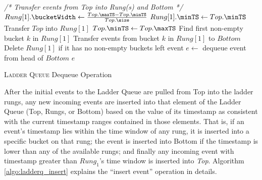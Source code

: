 \documentclass[11pt]{book}
\begin{document}
\begin{algorithm}
\DontPrintSemicolon
{}

    \;
    \;
    \textit{/* Transfer events from Top into Rung(s) and Bottom */}\;
    \;
    $Rung[1].\bucketWidth \gets \frac{Top.\maxTS - Top.\minTS}{Top.\size}$\;
    \;
    $Rung[1].\minTS \gets Top.\minTS$\;
    Transfer $Top$ into $Rung[1]$\;
    $Top.\minTS \gets Top.\maxTS$\;
    Find first non-empty bucket $k$ in $Rung[1]$\;
    Transfer events from bucket $k$ in $Rung[1]$ to $Bottom$\;
    Delete $Rung[1]$ if it has no non-empty buckets left\;
    \;
    event $e \gets$ dequeue event from head of $Bottom$\;
    \Return $e$\;
    \;
\caption{\textsc{Ladder Queue} Dequeue Operation}\label{algo:ladderq_dequeue}
\end{algorithm}

After the initial events to the Ladder Queue are pulled from Top into the ladder rungs, any new incoming
events are inserted into that element of the Ladder Queue (Top, Rungs, or Bottom) based on the value of its
timestamp as consistent with the current timestamp ranges contained in those elements.  That is, if an event's
timestamp lies within the time window of any rung, it is inserted into a specific bucket on that rung; the
event is inserted into Bottom if the timestamp is lower than any of the available rungs; and finally any
incoming event with timestamp greater than $Rung_1$'s time window is inserted into \emph{Top}.  Algorithm
\ref{algo:ladderq_insert} explains the ``insert event'' operation in details.
\end{document}

